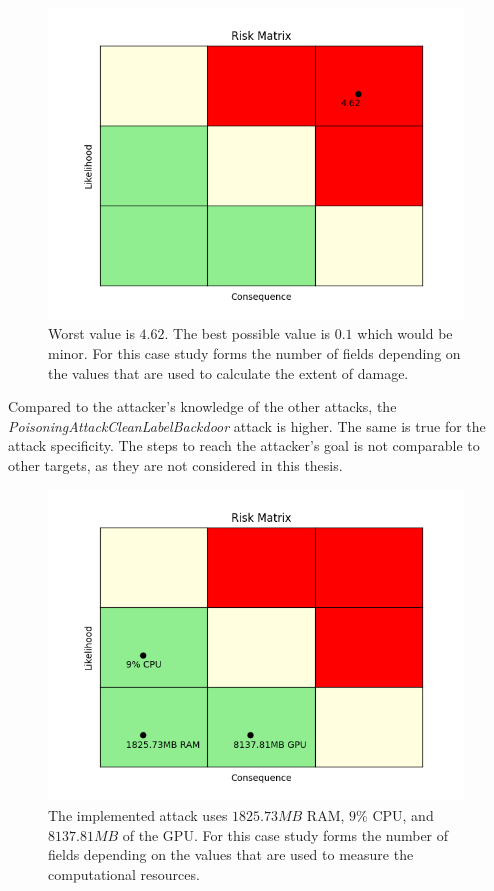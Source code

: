 \begin{figure}[ht!]
  \centering
  \includegraphics[width=11cm]{pictures/extent_of_damage_matrix.png}
  \caption{Worst value is $4.62$. The best possible value is $0.1$ which would be minor. For this case
  study forms the number of fields depending on the values that are used to calculate the extent of damage.}
  \label{fig:extent_of_damage_matrix}
\end{figure}

Compared to the attacker's knowledge of the other attacks, the \textit{PoisoningAttackCleanLabelBackdoor} attack is higher. The same is true for the attack specificity.
The steps to reach the attacker's goal is not comparable to other targets, as they are not considered in this thesis.

\begin{figure}[ht!]
  \centering
  \includegraphics[width=11cm]{pictures/attack_resources.png}
  \caption{The implemented attack uses $1825.73MB$ RAM, $9\%$ CPU, and $8137.81MB$ of the GPU. For this case
  study forms the number of fields depending on the values that are used to measure the computational resources.}
  \label{fig:resources}
\end{figure}


